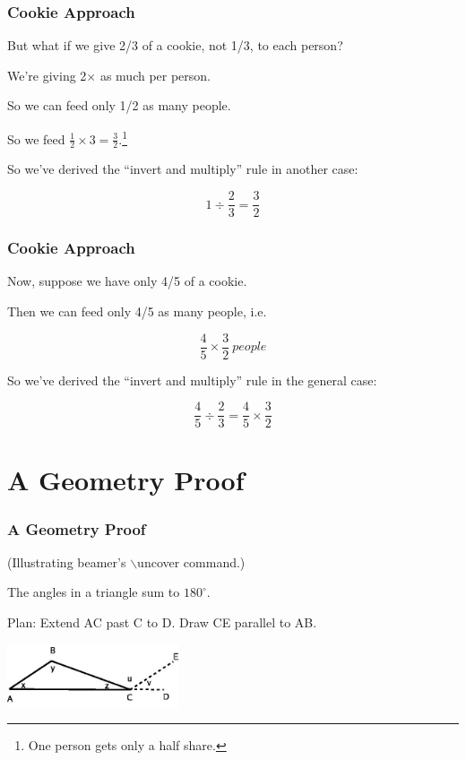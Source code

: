 \documentclass{beamer}
\begin{document}
\begin{frame}
\frametitle{Cookie Approach}

But what if we give 2/3 of a cookie, not 1/3, to each person?  

We're giving 2$\times$ as much per person. 

So we can feed only 1/2 as many people. 

So we feed  $\frac{1}{2} \times 3 = \frac{3}{2}$.\footnote{One person
gets only a half share.}

So we've derived the ``invert and multiply'' rule in another case:

$$
1 \div \frac{2}{3} = \frac{3}{2}
$$

\end{frame}

\begin{frame}
\frametitle{Cookie Approach}

Now, suppose we have only 4/5 of a cookie.

Then we can feed only 4/5 as many people, i.e.

$$
\frac{4}{5} \times \frac{3}{2} ~ people
$$

\pause 

So we've derived the ``invert and multiply'' rule in the general case:

$$
\frac{4}{5} \div \frac{2}{3} = \frac{4}{5} \times \frac{3}{2}
$$ 

\end{frame}

\section{A Geometry Proof}

\begin{frame}
\end{frame}

\begin{frame}
\frametitle{A Geometry Proof}

(Illustrating {\sc beamer}'s $\backslash$uncover command.)
\vskip 0.3in

\begin{theorem}
The angles in a triangle sum to $180^{\circ}$.
\end{theorem}

\pause

Plan:  Extend AC past C to D.  Draw CE parallel to AB.

\includegraphics[width = 2.0in]{BeamerTriangle.jpg}  

\end{frame}
\end{document}
